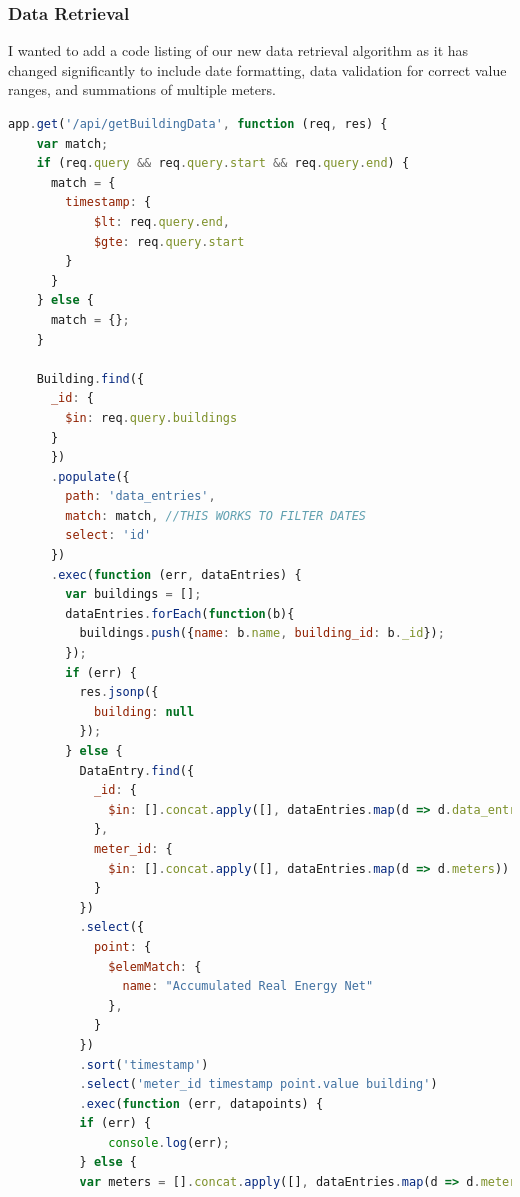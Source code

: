 \documentclass[letterpaper,10pt,serif,draftclsnofoot,onecolumn,compsoc,titlepage]{IEEEtran}
\begin{document}
\subsubsection{Data Retrieval} 
I wanted to add a code listing of our new data retrieval algorithm as it has changed significantly to include date formatting, data validation for correct value ranges, and summations of multiple meters.
\begin{lstlisting}[language=JavaScript]
  app.get('/api/getBuildingData', function (req, res) {
    var match;
    if (req.query && req.query.start && req.query.end) {
      match = {
        timestamp: {
            $lt: req.query.end,
            $gte: req.query.start
        }
      }
    } else {
      match = {};
    }

    Building.find({
      _id: {
        $in: req.query.buildings
      }
      })
      .populate({
        path: 'data_entries',
        match: match, //THIS WORKS TO FILTER DATES
        select: 'id'
      })
      .exec(function (err, dataEntries) {
        var buildings = [];
        dataEntries.forEach(function(b){
          buildings.push({name: b.name, building_id: b._id});
        });
        if (err) {
          res.jsonp({
            building: null
          });
        } else {
          DataEntry.find({
            _id: {
              $in: [].concat.apply([], dataEntries.map(d => d.data_entries))
            },
            meter_id: {
              $in: [].concat.apply([], dataEntries.map(d => d.meters))
            }
          })
          .select({
            point: {
              $elemMatch: {
                name: "Accumulated Real Energy Net"
              },
            }
          })
          .sort('timestamp')
          .select('meter_id timestamp point.value building')
          .exec(function (err, datapoints) {
          if (err) {
              console.log(err);
          } else {
          var meters = [].concat.apply([], dataEntries.map(d => d.meters));


\end{lstlisting}
\end{document}
